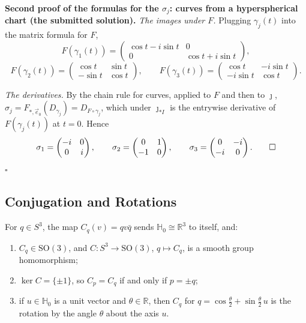 \documentclass[11pt]{report}
\makeatletter
\newcounter{thmcounter}[section]
\renewenvironment{proof}[1][Proof]{\noindent\textbf{#1.} }{\hfill$\square$\par\vspace{5pt}}
\newcommand{\thmlabel}[1]{\edef\@currentlabel{\arabic{section}.\arabic{thmcounter}}\label{#1}}
\newcommand{\SO}{\mathrm{SO}}
\makeatother
\begin{document}
\begin{proof}[Second proof of the formulas for the $\sigma_j$: curves from a hyperspherical chart (the submitted solution)]
\emph{The images under $F$.} Plugging $\gamma_j(t)$ into the matrix formula for $F$,
\[
F(\gamma_1(t)) = \begin{pmatrix} \cos t - i \sin t & 0 \\ 0 & \cos t + i \sin t \end{pmatrix},
\]
\[
F(\gamma_2(t)) = \begin{pmatrix} \cos t & \sin t \\ -\sin t & \cos t \end{pmatrix}, \qquad
F(\gamma_3(t)) = \begin{pmatrix} \cos t & -i \sin t \\ -i \sin t & \cos t \end{pmatrix}.
\]

\emph{The derivatives.} By the chain rule for curves, applied to $F$ and then to $\jmath$, $\sigma_j = F_{*,\vec e_0}(D_{\gamma_j}) = D_{F \circ \gamma_j}$, which under $\jmath_{*I}$ is the entrywise derivative of $F(\gamma_j(t))$ at $t = 0$. Hence
\[
\sigma_1 = \begin{pmatrix} -i & 0 \\ 0 & i \end{pmatrix}, \qquad \sigma_2 = \begin{pmatrix} 0 & 1 \\ -1 & 0 \end{pmatrix}, \qquad \sigma_3 = \begin{pmatrix} 0 & -i \\ -i & 0 \end{pmatrix}. \qedhere
\]
\end{proof}

\subsection{Conjugation and Rotations}\label{sub:conjugation}

\begin{propbox}\thmlabel{prop:conjugation-so3}
For $q \in S^3$, the map $C_q(v) = q v \bar q$ sends $\mathbb{H}_0 \cong \mathbb{R}^3$ to itself, and:
\begin{enumerate}
    \item $C_q \in \SO(3)$, and $C : S^3 \to \SO(3)$, $q \mapsto C_q$, is a smooth group homomorphism;
    \item $\ker C = \{\pm 1\}$, so $C_p = C_q$ if and only if $p = \pm q$;
    \item if $u \in \mathbb{H}_0$ is a unit vector and $\theta \in \mathbb{R}$, then $C_q$ for $q = \cos\frac\theta2 + \sin\frac\theta2\, u$ is the rotation by the angle $\theta$ about the axis $u$.
\end{enumerate}
\end{propbox}
\end{document}
